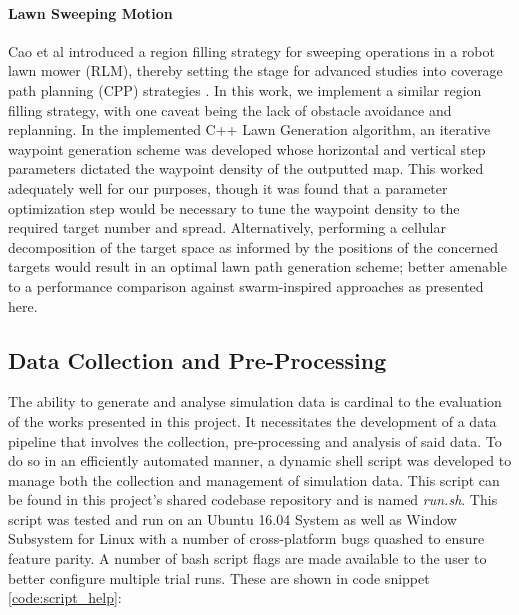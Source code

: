\documentclass{report}
\begin{document}
\paragraph{Lawn Sweeping Motion}
Cao et al \cite{Cao1988} introduced a region filling strategy for sweeping operations in a robot lawn mower (RLM), thereby setting the stage for advanced studies into coverage path planning (CPP) strategies \cite{Galceran2013}. In this work, we implement a similar region filling strategy, with one caveat being the lack of obstacle avoidance and replanning. In the implemented C++ Lawn Generation algorithm, an iterative waypoint generation scheme was developed whose horizontal and vertical step parameters dictated the waypoint density of the outputted map. This worked adequately well for our purposes, though it was found that a parameter optimization step would be necessary to tune the waypoint density to the required target number and spread. Alternatively, performing a cellular decomposition of the target space as informed by the positions of the concerned targets would result in an optimal lawn path generation scheme; better amenable to a performance comparison against swarm-inspired approaches as presented here.

\newpage

\subsection{Data Collection and Pre-Processing}
The ability to generate and analyse simulation data is cardinal to the evaluation of the works presented in this project. It necessitates the development of a data pipeline that involves the collection, pre-processing and analysis of said data. To do so in an efficiently automated manner, a dynamic shell script was developed to manage both the collection and management of simulation data. This script can be found in this project's shared codebase repository \cite{SWARMCODE} and is named \textit{run.sh}. This script was tested and run on an Ubuntu 16.04 System as well as Window Subsystem for Linux with a number of cross-platform bugs quashed to ensure feature parity. A number of bash script flags are made available to the user to better configure multiple trial runs. These are shown in code snippet \ref{code:script_help}:
\end{document}
